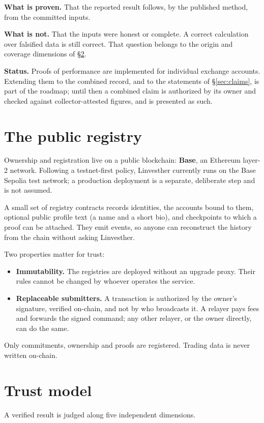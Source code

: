 \documentclass[11pt,a4paper]{article}
\begin{document}
\textbf{What is proven.} That the reported result follows, by the published method, from the committed inputs.

\textbf{What is not.} That the inputs were honest or complete. A correct calculation over falsified data is still correct. That question belongs to the origin and coverage dimensions of \S\ref{sec:trust}.

\textbf{Status.} Proofs of performance are implemented for individual exchange accounts. Extending them to the combined record, and to the statements of \S\ref{sec:claims}, is part of the roadmap; until then a combined claim is authorized by its owner and checked against collector-attested figures, and is presented as such.

\section{The public registry}\label{sec:chain}
Ownership and registration live on a public blockchain: \textbf{Base}, an Ethereum layer-2 network. Following a testnet-first policy, Linvesther currently runs on the Base Sepolia test network; a production deployment is a separate, deliberate step and is not assumed.

A small set of registry contracts records identities, the accounts bound to them, optional public profile text (a name and a short bio), and checkpoints to which a proof can be attached. They emit events, so anyone can reconstruct the history from the chain without asking Linvesther.

Two properties matter for trust:
\begin{itemize}[leftmargin=1.2em,itemsep=0.2em]
\item \textbf{Immutability.} The registries are deployed without an upgrade proxy. Their rules cannot be changed by whoever operates the service.
\item \textbf{Replaceable submitters.} A transaction is authorized by the owner's signature, verified on-chain, and not by who broadcasts it. A relayer pays fees and forwards the signed command; any other relayer, or the owner directly, can do the same.
\end{itemize}

Only commitments, ownership and proofs are registered. Trading data is never written on-chain.

\newpage
\section{Trust model}\label{sec:trust}
A verified result is judged along five independent dimensions.
\end{document}
